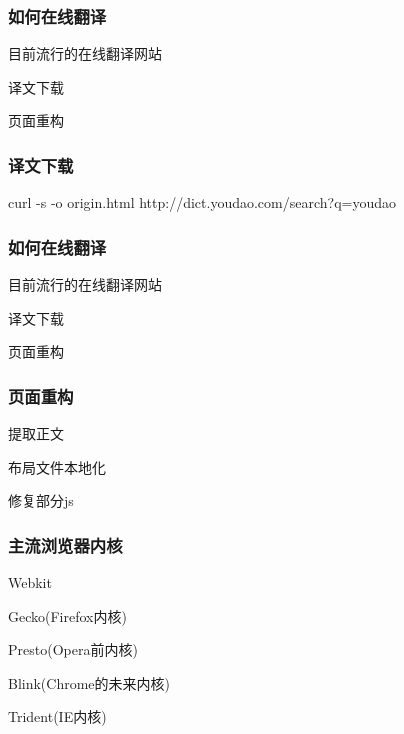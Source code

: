 \documentclass[10pt]{beamer}
\begin{document}
\begin{CJK*}{UTF8}{song}
\begin{frame}
  \frametitle{\Large{如何在线翻译}}
\LARGE\begin{itemize}
 {\item 目前流行的在线翻译网站
  \item 译文下载
  \item 页面重构}
\end{itemize}
\end{frame}


\begin{frame}
   \frametitle{译文下载}
   curl -s -o origin.html http://dict.youdao.com/search?q=youdao
\end{frame}

\begin{frame}
  \frametitle{\Large{如何在线翻译}}
\LARGE\begin{itemize}
 {\item 目前流行的在线翻译网站
  \item 译文下载
  \item 页面重构}
\end{itemize}
\end{frame}

\begin{frame}
   \frametitle{页面重构}
\LARGE\begin{itemize}
 {\item 提取正文
  \item 布局文件本地化
  \item 修复部分js
 }
\end{itemize}
\end{frame}
\begin{frame}
   \frametitle{主流浏览器内核}
\Large\begin{itemize}
 {\item Webkit
  \item Gecko(Firefox内核)
  \item Presto(Opera前内核)
  \item Blink(Chrome的未来内核)
  \item Trident(IE内核)
 }
\end{itemize}
\end{frame}


\end{CJK*}
\end{document}
